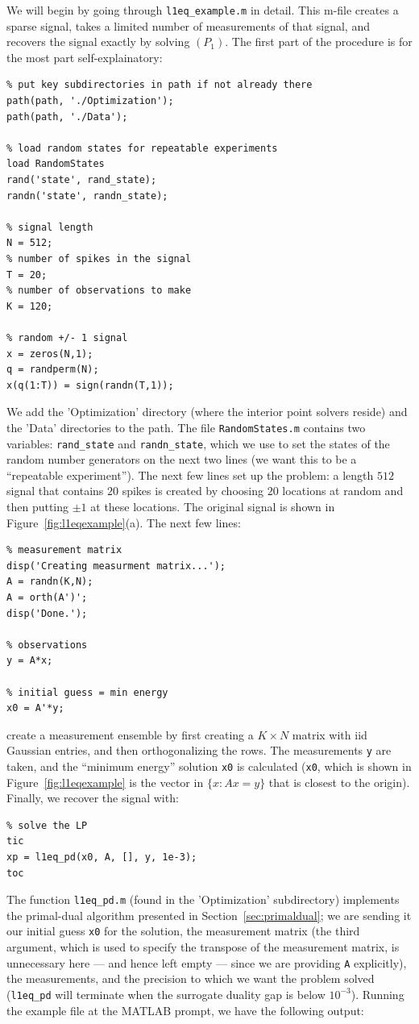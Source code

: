 \documentclass{article}
\newcommand{\<}{\langle}
\renewcommand{\>}{\rangle}
\begin{document}
We will begin by going through \texttt{l1eq\_example.m} in detail.  This m-file creates a sparse signal, takes a limited number of measurements of that signal, and recovers the signal exactly by solving $(P_1)$.  The first part of the procedure is for the most part self-explainatory:
\begin{verbatim}
% put key subdirectories in path if not already there 
path(path, './Optimization'); 
path(path, './Data');

% load random states for repeatable experiments 
load RandomStates 
rand('state', rand_state);
randn('state', randn_state);

% signal length
N = 512;
% number of spikes in the signal
T = 20;
% number of observations to make
K = 120;

% random +/- 1 signal
x = zeros(N,1);
q = randperm(N);
x(q(1:T)) = sign(randn(T,1));
\end{verbatim}
We add the 'Optimization' directory (where the interior point solvers reside) and the 'Data' directories to the path.  The file \texttt{RandomStates.m} contains two variables: \texttt{rand\_state} and \texttt{randn\_state}, which we use to set the states of the random number generators on the next two lines (we want this to be a ``repeatable experiment'').  The next few lines set up the problem: a length $512$ signal that contains $20$ spikes is created by choosing $20$ locations at random and then putting $\pm 1$ at these locations.  The original signal is shown in Figure~\ref{fig:l1eqexample}(a).  The next few lines:
\begin{verbatim}
% measurement matrix
disp('Creating measurment matrix...');
A = randn(K,N);
A = orth(A')';
disp('Done.');
	
% observations
y = A*x;

% initial guess = min energy
x0 = A'*y;
\end{verbatim}
create a measurement ensemble by first creating a $K\times N$ matrix with iid Gaussian entries, and then orthogonalizing the rows.  The measurements \texttt{y} are taken, 
and the ``minimum energy'' solution \texttt{x0} is calculated (\texttt{x0}, which is shown in Figure~\ref{fig:l1eqexample} is the vector in $\{x: Ax=y\}$ that is closest to the origin).  Finally, we recover the signal with:
\begin{verbatim}
% solve the LP
tic
xp = l1eq_pd(x0, A, [], y, 1e-3);
toc
\end{verbatim}
The function \texttt{l1eq\_pd.m} (found in the 'Optimization' subdirectory) implements the primal-dual algorithm presented in Section~\ref{sec:primaldual}; we are sending it our initial guess \texttt{x0} for the solution, the measurement matrix (the third argument, which is used to specify the transpose of the measurement matrix, is unnecessary here --- and hence left empty --- since we are providing \texttt{A} explicitly), the measurements, and the precision to which we want the problem solved (\texttt{l1eq\_pd} will terminate when the surrogate duality gap is below $10^{-3}$).  Running the example file at the MATLAB prompt, we have the following output:
\end{document}
